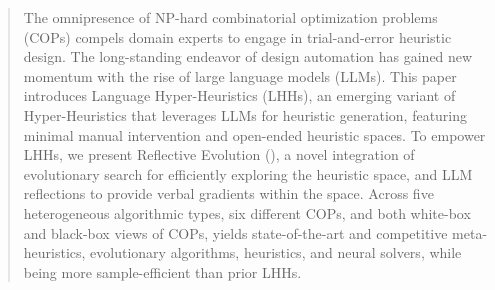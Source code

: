 \begin{abstract}
  The omnipresence of NP-hard combinatorial optimization problems (COPs) compels domain experts to engage in trial-and-error heuristic design. The long-standing endeavor of design automation has gained new momentum with the rise of large language models (LLMs). This paper introduces Language Hyper-Heuristics (LHHs), an emerging variant of Hyper-Heuristics that leverages LLMs for heuristic generation, featuring minimal manual intervention and open-ended heuristic spaces. 
  To empower LHHs, we present Reflective Evolution (\our{}), a novel integration of evolutionary search for efficiently exploring the heuristic space, and LLM reflections to provide verbal gradients within the space.
  Across five heterogeneous algorithmic types, six different COPs, and both white-box and black-box views of COPs, \our{} yields state-of-the-art and competitive meta-heuristics, evolutionary algorithms, heuristics, and neural solvers, while being more sample-efficient than prior LHHs. 

\end{abstract}